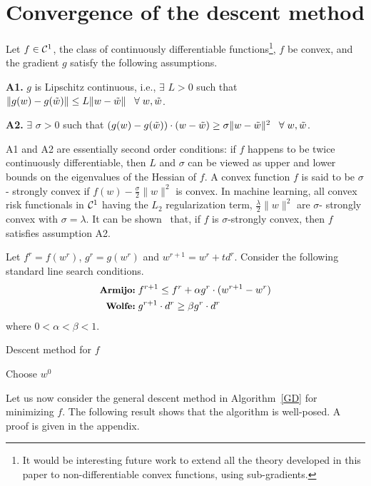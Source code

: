 \section{Convergence of the descent method}
\label{general}

Let $f\in{\cal{C}}^1$, the class of continuously differentiable functions\footnote{It would be interesting future work to extend all the theory developed in this paper to non-differentiable convex functions, using sub-gradients.}, $f$ be convex, and the gradient $g$ satisfy the following assumptions.

{\bf A1.} $g$ is Lipschitz continuous, i.e., $\exists$ $L>0$ such that
$\|g(w)-g(\tilde{w})\| \le L \|w-\tilde{w}\| \;\;\; \forall \; w, \tilde{w}$.

{\bf A2.} $\exists$ $\sigma >0$ such that
$(g(w)-g(\tilde{w}))\cdot(w-\tilde{w}) \ge \sigma \|w-\tilde{w}\|^2  \;\;\; \forall \; w, \tilde{w}$.

A1 and A2 are essentially second order conditions: if $f$ happens to be twice continuously differentiable, then $L$ and $\sigma$ can be viewed as upper and lower bounds on the eigenvalues of the Hessian of $f$. A convex function $f$ is said to be $\sigma$- strongly convex if $f(w)-\frac{\sigma}{2} \|w\|^2$ is convex. In machine learning, all convex risk functionals in ${\cal{C}}^1$ having the $L_2$ regularization term, $\frac{\lambda}{2} \|w\|^2$ are $\sigma$- strongly convex with $\sigma=\lambda$. It can be shown~\cite{smola2008} 
that, if $f$ is $\sigma$-strongly convex, then $f$ satisfies assumption A2.

Let $f^r=f(w^r)$, $g^r=g(w^r)$ and $w^{r+1}=w^r+t d^r$. Consider the following standard line search conditions.
\begin{eqnarray}
\mbox{{\small\bf Armijo:}}\; & f^{r+1} \le f^r + \alpha g^r\cdot(w^{r+1}-w^r) \label{ag} \\
\mbox{{\small\bf Wolfe:}}\;  & g^{r+1}\cdot d^r \ge \beta g^r\cdot d^r \label{wolfe}
\end{eqnarray}
where $0<\alpha<\beta<1$.

\begin{algorithm2e}
\caption{Descent method for $f$\label{GD}}
Choose $w^0$\;
\end{algorithm2e}
Let us now consider the general descent method in Algorithm~\ref{GD} for minimizing $f$. The following result shows that the algorithm is well-posed. A proof is given in the appendix.

